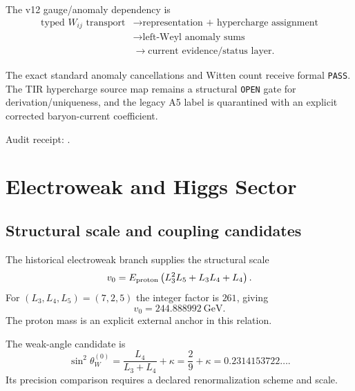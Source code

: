 The v12 gauge/anomaly dependency is
\[
\boxed{\begin{aligned}
\text{typed }W_{ij}\text{ transport}
&\to \text{representation + hypercharge assignment}\\
&\to \text{left-Weyl anomaly sums}\\
&\to \text{current evidence/status layer}.
\end{aligned}}
\]

The exact standard anomaly cancellations and Witten count receive formal \texttt{PASS}. The TIR hypercharge source map remains a structural \texttt{OPEN} gate for derivation/uniqueness, and the legacy A5 label is quarantined with an explicit corrected baryon-current coefficient.

Audit receipt:
.

\clearpage

\chapter{Electroweak and Higgs Sector}
\label{ch:v12_electroweak_higgs}

\section{Structural scale and coupling candidates}

The historical electroweak branch supplies the structural scale
\begin{equation}
v_0
=E_{\rm proton}\left(L_3^2L_5+L_3L_4+L_4\right).
\label{eq:v12_ew_v0}
\end{equation}
For $(L_3,L_4,L_5)=(7,2,5)$ the integer factor is $261$, giving
\begin{equation}
\boxed{v_0=244.888992\ \mathrm{GeV}}.
\end{equation}
The proton mass is an explicit external anchor in this relation.

The weak-angle candidate is
\begin{equation}
\boxed{
\sin^2\theta_W^{(0)}
=\frac{L_4}{L_3+L_4}+\kappa
=\frac29+\kappa
=0.2314153722\ldots .
}
\label{eq:v12_sin2w0}
\end{equation}
Its precision comparison requires a declared renormalization scheme and scale.

